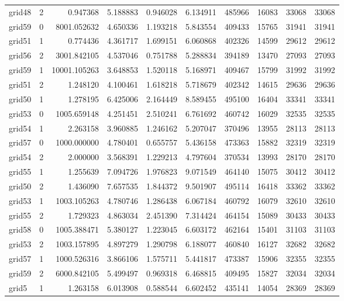 \begin{longtable}{|l|r|r|r|r|r|r|r|r|r|}
grid48 & 2 & 0.947368 & 5.188883 & 0.946028 & 6.134911 & 485966 & 16083 & 33068 & 33068 \\
grid59 & 0 & 8001.052632 & 4.650336 & 1.193218 & 5.843554 & 409433 & 15765 & 31941 & 31941 \\
grid51 & 1 & 0.774436 & 4.361717 & 1.699151 & 6.060868 & 402326 & 14599 & 29612 & 29612 \\
grid56 & 2 & 3001.842105 & 4.537046 & 0.751788 & 5.288834 & 394189 & 13470 & 27093 & 27093 \\
grid59 & 1 & 10001.105263 & 3.648853 & 1.520118 & 5.168971 & 409467 & 15799 & 31992 & 31992 \\
grid51 & 2 & 1.248120 & 4.100461 & 1.618218 & 5.718679 & 402342 & 14615 & 29636 & 29636 \\
grid50 & 1 & 1.278195 & 6.425006 & 2.164449 & 8.589455 & 495100 & 16404 & 33341 & 33341 \\
grid53 & 0 & 1005.659148 & 4.251451 & 2.510241 & 6.761692 & 460742 & 16029 & 32535 & 32535 \\
grid54 & 1 & 2.263158 & 3.960885 & 1.246162 & 5.207047 & 370496 & 13955 & 28113 & 28113 \\
grid57 & 0 & 1000.000000 & 4.780401 & 0.655757 & 5.436158 & 473363 & 15882 & 32319 & 32319 \\
grid54 & 2 & 2.000000 & 3.568391 & 1.229213 & 4.797604 & 370534 & 13993 & 28170 & 28170 \\
grid55 & 1 & 1.255639 & 7.094726 & 1.976823 & 9.071549 & 464140 & 15075 & 30412 & 30412 \\
grid50 & 2 & 1.436090 & 7.657535 & 1.844372 & 9.501907 & 495114 & 16418 & 33362 & 33362 \\
grid53 & 1 & 1003.105263 & 4.780746 & 1.286438 & 6.067184 & 460792 & 16079 & 32610 & 32610 \\
grid55 & 2 & 1.729323 & 4.863034 & 2.451390 & 7.314424 & 464154 & 15089 & 30433 & 30433 \\
grid58 & 0 & 1005.388471 & 5.380127 & 1.223045 & 6.603172 & 462164 & 15401 & 31103 & 31103 \\
grid53 & 2 & 1003.157895 & 4.897279 & 1.290798 & 6.188077 & 460840 & 16127 & 32682 & 32682 \\
grid57 & 1 & 1000.526316 & 3.866106 & 1.575711 & 5.441817 & 473387 & 15906 & 32355 & 32355 \\
grid59 & 2 & 6000.842105 & 5.499497 & 0.969318 & 6.468815 & 409495 & 15827 & 32034 & 32034 \\
grid5 & 1 & 1.263158 & 6.013908 & 0.588544 & 6.602452 & 435141 & 14054 & 28369 & 28369 \\

\end{longtable}
